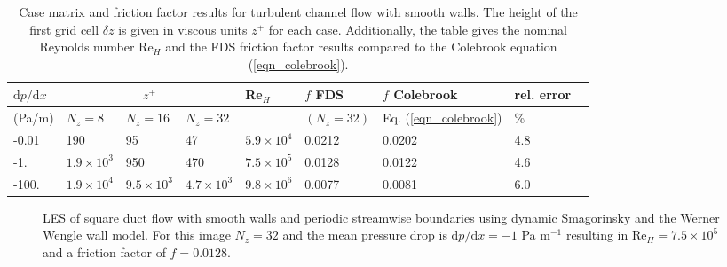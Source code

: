 \documentclass[11pt]{book}
\begin{document}
\begin{table}
\begin{center}
\caption[Case matrix for Moody chart]{\label{tab_zplus} Case matrix and friction factor results for turbulent channel flow with smooth walls.
The height of the first grid cell $\delta z$ is given in viscous units $z^+$ for each case.  Additionally, the table gives the nominal Reynolds number Re$_H$ and the FDS friction factor results compared to the Colebrook equation (\ref{eqn_colebrook}).}
\vspace{0.5cm}
\begin{tabular}{|*{9}{l|}}
\hline
$\mbox{d}p/\mbox{d}x$   & \multicolumn{3}{c|}{$z^+$} &  Re$_H$  & $f$ FDS  & $f$ Colebrook & rel. error \\
\hline (Pa/m)          & $N_z=8$          & $N_z=16$          & $N_z=32$          &                   & $(N_z=32)$ & Eq. (\ref{eqn_colebrook}) & \% \\
\hline\hline -0.01  & 190              & 95                & 47                & $5.9\times 10^4$  & 0.0212     & 0.0202   & 4.8                 \\
\hline -1.    & $1.9\times 10^3$ & 950               & 470               & $7.5\times 10^5$  & 0.0128     & 0.0122   & 4.6                 \\
\hline -100.  & $1.9\times 10^4$ & $9.5\times 10^3$  & $4.7\times 10^3$  & $9.8\times 10^6$  & 0.0077     & 0.0081   & 6.0                 \\
\hline
\end{tabular}
\end{center}
\end{table}
\begin{figure}
   \begin{center}
      \caption[LES of square duct flow]{\label{fig_channel_flow_setup} LES of square duct flow with smooth walls and periodic streamwise boundaries using dynamic Smagorinsky and the Werner Wengle wall model.  For this image $N_z=32$ and the mean pressure drop is $\mbox{d}p/\mbox{d}x = -1$ Pa m$^{-1}$ resulting in Re$_H = 7.5\times 10^5$ and a friction factor of $f=0.0128$.}
   \end{center}
\end{figure}
\end{document}
